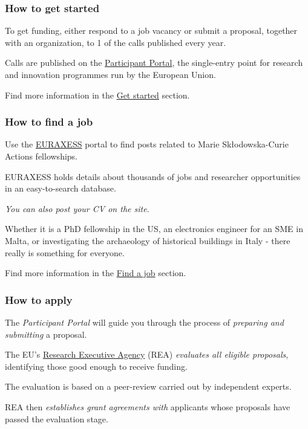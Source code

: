 \documentclass[oneside]{book}
\numberwithin{equation}{section}
\begin{document}
\subsubsection{How to get started}
To get funding, either respond to a job vacancy or submit a proposal, together with an organization, to 1 of the calls published every year.

Calls are published on the \href{http://ec.europa.eu/research/participants/portal/desktop/en/home.html}{Participant Portal}, the single-entry point for research and innovation programmes run by the European Union.

%
Find more information in the \href{https://ec.europa.eu/research/mariecurieactions/how-to/get-started_en}{Get started} section.

\subsubsection{How to find a job}
Use the \href{https://euraxess.ec.europa.eu/}{EURAXESS} portal to find posts related to Marie Skłodowska-Curie Actions fellowships.

%
EURAXESS holds details about thousands of jobs and researcher opportunities in an easy-to-search database.

\textit{You can also post your CV on the site}.

Whether it is a PhD fellowship in the US, an electronics engineer for an SME in Malta, or investigating the archaeology of historical buildings in Italy - there really is something for everyone.

%
Find more information in the \href{https://ec.europa.eu/research/mariecurieactions/how-to/find-job_en}{Find a job} section.

\subsubsection{How to apply}
The \textit{Participant Portal} will guide you through the process of \textit{preparing and submitting} a proposal.

%
The EU's \href{https://ec.europa.eu/info/departments/research-executive-agency_en}{Research Executive Agency} (REA) \textit{evaluates all eligible proposals}, identifying those good enough to receive funding.

The evaluation is based on a peer-review carried out by independent experts.

%
REA then \textit{establishes grant agreements with} applicants whose proposals have passed the evaluation stage.
\end{document}
